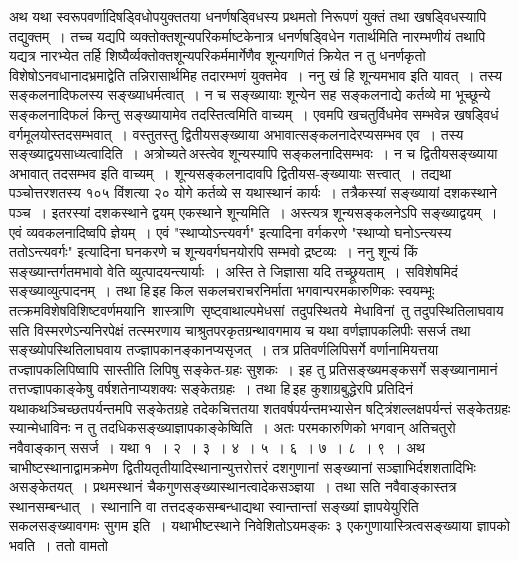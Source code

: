 \documentclass[11pt, openany]{book}
\begin{document}
\vspace{2mm}
अथ यथा स्वरूपवर्णादिषड्विधोपयुक्ततया धनर्णषड्विधस्य प्रथमतो निरूपणं
युक्तं तथा खषड्विधस्यापि तद्युक्तम्~। तच्च यद्यपि व्यक्तोक्तशून्यपरिकर्माष्टकेनात्र धनर्णषड्विधेन गतार्थमिति नारम्भणीयं तथापि
यद्यत्र नारभ्येत तर्हि शिष्यैर्व्यक्तोक्तशून्यपरिकर्ममार्गेणैव
शून्यगणितं क्रियेत न तु धनर्णकृतो विशेषोऽनवधानादभ्रमाद्वेति तन्निरासार्थमिह तदारम्भणं
युक्तमेव~। ननु खं हि शून्यमभाव इति यावत्~। तस्य सङ्कलनादिफलस्य सङ्ख्याधर्मत्वात्~। न च सङ्ख्यायाः शून्येन सह सङ्कलनाद्ये कर्तव्ये मा भूच्छून्ये
सङ्कलनादिफलं किन्तु सङ्ख्यायामेव तदस्तित्वमिति वाच्यम्~। एवमपि खचतुर्विधमेव सम्भवेन्न
खषड्विधं वर्गमूलयोस्तदसम्भवात्~। वस्तुतस्तु द्वितीयसङ्ख्याया
अभावात्सङ्कलनादेरप्यसम्भव एव~।
तस्य सङ्ख्याद्वयसाध्यत्वादिति~। अत्रोच्यते\textendash \,{\qt अस्त्वेव शून्यस्यापि सङ्कलनादिसम्भवः}~।
न च द्वितीयसङ्ख्याया अभावात् तदसम्भव इति वाच्यम्~। शून्यसङ्कलनादावपि
द्वितीयस-ङ्ख्यायाः सत्त्वात्~। तद्यथा\textendash \,पञ्चोत्तरशतस्य १०५ विंशत्या २० योगे कर्तव्ये स यथास्थानं कार्यः~। तत्रैकस्यां सङ्ख्यायां दशकस्थाने पञ्च~। इतरस्यां दशकस्थाने
द्वयम् एकस्थाने शून्यमिति~। अस्त्यत्र शून्यसङ्कलनेऽपि सङ्ख्याद्वयम्~। एवं
व्यवकलनादिष्वपि ज्ञेयम्~। एवं {\qt "स्थाप्योऽन्त्यवर्ग"} इत्यादिना वर्गकरणे {\qt "स्थाप्यो घनोऽन्त्यस्य ततोऽन्त्यवर्गः"} इत्यादिना घनकरणे च शून्यवर्गघनयोरपि सम्भवो द्रष्टव्यः~। ननु शून्यं किं सङ्ख्यान्तर्गतमभावो वेति व्युत्पादयन्त्यार्याः~। अस्ति ते
जिज्ञासा यदि तच्छ्रूयताम्~। सविशेषमिदं सङ्ख्याव्युत्पादनम्~। तथा हि\textendash \,इह 
किल सकलचराचरनिर्माता भगवान्परमकारुणिकः
स्वयम्भूः तत्क्रमविशेषविशिष्टवर्णमयानि \,शास्त्राणि \,सृष्ट्वाथाल्पमेधसां \,तदुपस्थितये \,मेधाविनां \,तु
तदुपस्थितिलाघवाय सति विस्मरणेऽन्यनिरपेक्षं तत्स्मरणाय चाश्रुतपरकृतग्रन्थावगमाय च
\newpage
\noindent यथा वर्णज्ञापकलिपीः ससर्ज तथा सङ्ख्योपस्थितिलाघवाय तज्ज्ञापकानङ्कानप्यसृजत्~। तत्र प्रतिवर्णलिपिसर्गे वर्णानामियत्तया तज्ज्ञापकलिपिष्वापि
सास्तीति लिपिषु सङ्केत-ग्रहः सुशकः~। इह तु प्रतिसङ्ख्यमङ्कसर्गे
सङ्ख्यानामानं तत्तज्ज्ञापकाङ्केषु वर्षशतेनाप्यशक्यः सङ्केतग्रहः~। तथा
हि\textendash \,इह कुशाग्रबुद्धेरपि प्रतिदिनं यथाकथञ्चिच्छतपर्यन्तमपि सङ्केतग्रहे
तदेकचित्ततया शतवर्षपर्यन्तमभ्यासेन षट्त्रिंशल्लक्षपर्यन्तं सङ्केतग्रहः स्यान्मेधाविनः
न तु तदधिकसङ्ख्याज्ञापकाङ्केष्विति~। अतः परमकारुणिको भगवान् अतिचतुरो
नवैवाङ्कान् ससर्ज~। यथा १~। २~। ३~। ४~। ५~। ६~। ७~। ८~। ९~।
अथ चाभीष्टस्थानाद्वामक्रमेण द्वितीयतृतीयादिस्थानान्युत्तरोत्तरं
दशगुणानां सङ्ख्यानां सञ्ज्ञाभिर्दशशतादिभिः असङ्केतयत्~। प्रथमस्थानं
चैकगुणसङ्ख्यास्थानत्वादेकसञ्ज्ञया~। तथा सति नवैवाङ्कास्तत्र स्थानसम्बन्धात्~। स्थानानि वा तत्तदङ्कसम्बन्धाद्यथा स्वान्तान्तां सङ्ख्यां ज्ञापयेयुरिति सकलसङ्ख्यावगमः सुगम इति~। यथाभीष्टस्थाने निवेशितोऽयमङ्कः ३ एकगुणायास्त्रित्वसङ्ख्याया ज्ञापको भवति~। ततो वामतो
\end{document}
